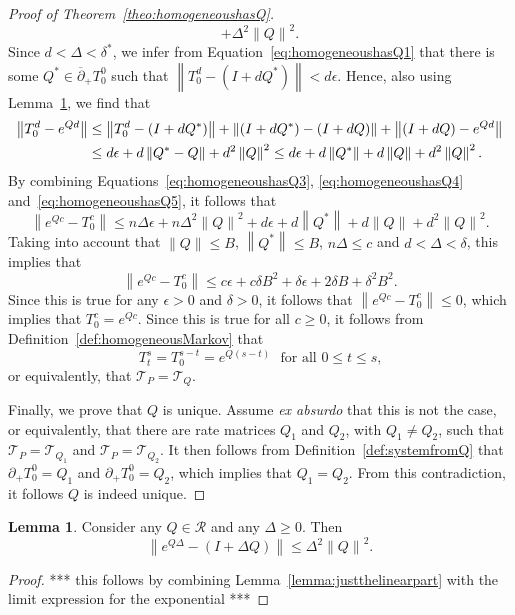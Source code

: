 \documentclass[10pt]{paper}
\theoremstyle{definition}
\newtheorem{lemma}[theorem]{Lemma}
\newcommand{\norm}[1]{\left\lVert #1 \right\rVert}
\begin{document}
\begin{proof}[Proof of Theorem~\ref{theo:homogeneoushasQ}]
\begin{equation}
+
\Delta^2\norm{Q}^2.
\end{equation}
Since $d<\Delta<\delta^*$, we infer from Equation~\eqref{eq:homogeneoushasQ1} that there is some $Q^*\in\overline{\partial}_{+}
{T^0_{0}}$ such that $\norm{T_0^{d}-(I+d Q^*)}<d\epsilon$. Hence, also using Lemma~\ref{lemma:linearpartofexponential}, we find that
\begin{align}
\norm{T_0^{d}-e^{Qd}}
&\leq
\norm{T_0^{d}-(I+d Q^*)}
+
\norm{(I+d Q^*)-(I+d Q)}
+
\norm{(I+d Q)-e^{Qd}}\notag\\
&\leq
d\epsilon+d\norm{Q^*-Q}
+d^2\norm{Q}^2
\leq
d\epsilon+d\norm{Q^*}
+d\norm{Q}
+d^2\norm{Q}^2.\label{eq:homogeneoushasQ5}
\end{align}
By combining Equations~\eqref{eq:homogeneoushasQ3}, \eqref{eq:homogeneoushasQ4} and~\eqref{eq:homogeneoushasQ5}, it follows that
\begin{equation*}
\norm{
	e^{Qc}-T_0^c
}
\leq
n\Delta\epsilon
+
n\Delta^2\norm{Q}^2
+
d\epsilon
+d\norm{Q^*}
+d\norm{Q}
+d^2\norm{Q}^2.
\end{equation*}
Taking into account that $\norm{Q}\leq B$, $\norm{Q^*}\leq B$, $n\Delta\leq c$ and $d<\Delta<\delta$, this implies that
\begin{equation*}
\norm{
	e^{Qc}-T_0^c
}
\leq
c\epsilon
+
c\delta B^2
+
\delta\epsilon
+2\delta B
+\delta^2 B^2.
\end{equation*}
Since this is true for any $\epsilon>0$ and $\delta>0$, it follows that $\norm{e^{Qc}-T_0^c}\leq0$, which implies that $T_0^c=e^{Qc}$. Since this is true for all $c\geq0$, it follows from Definition~\ref{def:homogeneousMarkov} that
\begin{equation}\label{eq:homogeneoushasQ6}
T_t^s=T_0^{s-t}=e^{Q(s-t)}
\text{~~for all $0\leq t\leq s$,}
\end{equation}
or equivalently, that $\mathcal{T}_P=\mathcal{T}_Q$.

Finally, we prove that $Q$ is unique. Assume \emph{ex absurdo} that this is not the case, or equivalently, that there are rate matrices $Q_1$ and $Q_2$, with $Q_1\neq Q_2$, such that $\mathcal{T}_P=\mathcal{T}_{Q_1}$ and $\mathcal{T}_P=\mathcal{T}_{Q_2}$. It then follows from Definition~\ref{def:systemfromQ} that $\partial_{+}{T^0_{0}}=Q_1$ and $\partial_{+}{T^0_{0}}=Q_2$, which implies that $Q_1=Q_2$. From this contradiction, it follows $Q$ is indeed unique.
\end{proof}

\begin{lemma}\label{lemma:linearpartofexponential}
Consider any $Q\in\mathcal{R}$ and any $\Delta\geq0$. Then
\begin{equation*}
\norm{e^{Q\Delta}-(I+\Delta Q)}\leq
\Delta^2\norm{Q}^2.
\end{equation*}
\end{lemma}
\begin{proof}
*** this follows by combining Lemma~\ref{lemma:justthelinearpart} with the limit expression for the exponential ***
\end{proof}
\end{document}
